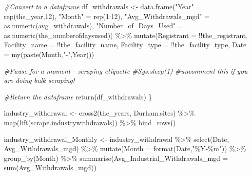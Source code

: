 \documentclass[
  12pt,
]{article}
\newenvironment{Shaded}{\begin{snugshade}}{\end{snugshade}}
\newcommand{\AttributeTok}[1]{\textcolor[rgb]{0.77,0.63,0.00}{#1}}
\newcommand{\CommentTok}[1]{\textcolor[rgb]{0.56,0.35,0.01}{\textit{#1}}}
\newcommand{\DecValTok}[1]{\textcolor[rgb]{0.00,0.00,0.81}{#1}}
\newcommand{\FunctionTok}[1]{\textcolor[rgb]{0.00,0.00,0.00}{#1}}
\newcommand{\NormalTok}[1]{#1}
\newcommand{\OtherTok}[1]{\textcolor[rgb]{0.56,0.35,0.01}{#1}}
\newcommand{\SpecialCharTok}[1]{\textcolor[rgb]{0.00,0.00,0.00}{#1}}
\newcommand{\StringTok}[1]{\textcolor[rgb]{0.31,0.60,0.02}{#1}}
\begin{document}
\begin{Shaded}
\begin{Highlighting}[]
  \CommentTok{\#Convert to a dataframe}
\NormalTok{  df\_withdrawals }\OtherTok{\textless{}{-}} \FunctionTok{data.frame}\NormalTok{(}\StringTok{"Year"} \OtherTok{=} \FunctionTok{rep}\NormalTok{(the\_year,}\DecValTok{12}\NormalTok{),}
                               \StringTok{"Month"} \OtherTok{=} \FunctionTok{rep}\NormalTok{(}\DecValTok{1}\SpecialCharTok{:}\DecValTok{12}\NormalTok{),}
                               \StringTok{"Avg\_Withdrawals\_mgd"} \OtherTok{=} \FunctionTok{as.numeric}\NormalTok{(avg\_withdrawals),}
                               \StringTok{"Number\_of\_Days\_Used"} \OtherTok{=} \FunctionTok{as.numeric}\NormalTok{(the\_numberofdaysused)) }\SpecialCharTok{\%\textgreater{}\%} 
    \FunctionTok{mutate}\NormalTok{(}\AttributeTok{Registrant =} \SpecialCharTok{!!}\NormalTok{the\_registrant,}
           \AttributeTok{Facility\_name =} \SpecialCharTok{!!}\NormalTok{the\_facility\_name,}
           \AttributeTok{Facility\_type =} \SpecialCharTok{!!}\NormalTok{the\_facility\_type,}
           \AttributeTok{Date =} \FunctionTok{my}\NormalTok{(}\FunctionTok{paste}\NormalTok{(Month,}\StringTok{"{-}"}\NormalTok{,Year)))}
  
  \CommentTok{\#Pause for a moment {-} scraping etiquette}
  \CommentTok{\#Sys.sleep(1) \#uncomment this if you are doing bulk scraping!}
  
  \CommentTok{\#Return the dataframe}
  \FunctionTok{return}\NormalTok{(df\_withdrawals)}
\NormalTok{\}}

\NormalTok{industry\_withdrawal }\OtherTok{\textless{}{-}} \FunctionTok{cross2}\NormalTok{(the\_years, Durham.sites) }\SpecialCharTok{\%\textgreater{}\%} 
  \FunctionTok{map}\NormalTok{(}\FunctionTok{lift}\NormalTok{(scrape.industrywithdrawals)) }\SpecialCharTok{\%\textgreater{}\%} 
  \FunctionTok{bind\_rows}\NormalTok{()}

\NormalTok{industry\_withdrawal\_Monthly }\OtherTok{\textless{}{-}}\NormalTok{ industry\_withdrawal }\SpecialCharTok{\%\textgreater{}\%}
  \FunctionTok{select}\NormalTok{(Date, Avg\_Withdrawals\_mgd) }\SpecialCharTok{\%\textgreater{}\%}
  \FunctionTok{mutate}\NormalTok{(}\AttributeTok{Month =} \FunctionTok{format}\NormalTok{(Date,}\StringTok{"\%Y{-}\%m"}\NormalTok{)) }\SpecialCharTok{\%\textgreater{}\%}
  \FunctionTok{group\_by}\NormalTok{(Month) }\SpecialCharTok{\%\textgreater{}\%}
  \FunctionTok{summarise}\NormalTok{(}\AttributeTok{Avg\_Industrial\_Withdrawals\_mgd =} \FunctionTok{sum}\NormalTok{(Avg\_Withdrawals\_mgd))}
\end{Highlighting}
\end{Shaded}
\end{document}

